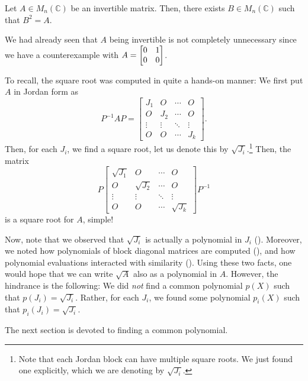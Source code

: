 \documentclass[12pt]{article}
\begin{document}
\begin{thm}
	Let $A \in M_{n}(\mathbb{C})$ be an invertible matrix. Then, there exists $B \in M_{n}(\mathbb{C})$ such that $B^{2} = A$.
\end{thm}
We had already seen that $A$ being invertible is not completely unnecessary since we have a counterexample with $A = \begin{bmatrix} 0 & 1 \\ 0 & 0 \end{bmatrix}$.

To recall, the square root was computed in quite a hands-on manner: We first put $A$ in Jordan form as
\begin{equation*} 
	P^{-1} A P = 
	\begin{bmatrix}
		J_{1} & O & \cdots & O \\
		O & J_{2} & \cdots & O \\
		\vdots & \vdots & \ddots & \vdots \\
		O & O & \cdots & J_{k}
	\end{bmatrix}.
\end{equation*}
Then, for each $J_{i}$, we find a square root, let us denote this by $\sqrt{J_{i}}$.\footnote{Note that each Jordan block can have multiple square roots. We just found one explicitly, which we are denoting by $\sqrt{J_{i}}$.} Then, the matrix
\begin{equation*} 
	P\begin{bmatrix}
		\sqrt{J_{1}} & O & \cdots & O \\
		O & \sqrt{J_{2}} & \cdots & O \\
		\vdots & \vdots & \ddots & \vdots \\
		O & O & \cdots & \sqrt{J_{k}}
	\end{bmatrix}P^{-1}
\end{equation*}
is a square root for $A$, simple!

Now, note that we observed that $\sqrt{J_{i}}$ is actually a polynomial in $J_{i}$ (). Moreover, we noted how polynomials of block diagonal matrices are computed (), and how polynomial evaluations interacted with similarity (). Using these two facts, one would hope that we can write $\sqrt{A}$ also as a polynomial in $A$. \newline
However, the hindrance is the following: We did \emph{not} find a common polynomial $p(X)$ such that $p(J_{i}) = \sqrt{J_{i}}$. Rather, for each $J_{i}$, we found some polynomial $p_{i}(X)$ such that $p_{i}(J_{i}) = \sqrt{J_{i}}$. 

The next section is devoted to finding a common polynomial.
\end{document}
